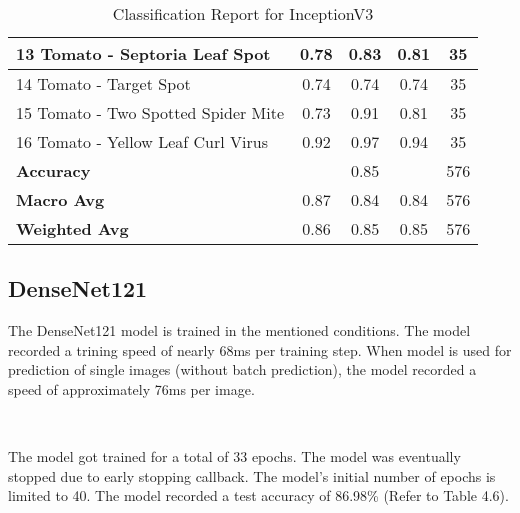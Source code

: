 \begin{table}[h!]
{\begin{tabular}{|l|c|c|c|c|}
    13 Tomato - Septoria Leaf Spot                    & 0.78               & 0.83            & 0.81              & 35               \\ \hline
    14 Tomato - Target Spot                           & 0.74               & 0.74            & 0.74              & 35               \\ \hline
    15 Tomato - Two Spotted Spider Mite               & 0.73               & 0.91            & 0.81              & 35               \\ \hline
    16 Tomato - Yellow Leaf Curl Virus                & 0.92               & 0.97            & 0.94              & 35               \\ \hline
    \textbf{Accuracy}                                 & \multicolumn{3}{c|}{0.85}            & 576              \\ \hline
    \textbf{Macro Avg}                                & 0.87               & 0.84            & 0.84              & 576              \\ \hline
    \textbf{Weighted Avg}                             & 0.86               & 0.85            & 0.85              & 576              \\ \hline
    \end{tabular}%
    }
    \caption{Classification Report for InceptionV3}
    \label{tab:classification_report_inv3}
\end{table}

\subsection{DenseNet121}

The DenseNet121 model is trained in the mentioned conditions. The model recorded a trining speed of nearly 68ms per training step. When model is used for prediction of single images (without batch prediction), the model recorded a speed of approximately 76ms per image. 

\

The model got trained for a total of 33 epochs. The model was eventually stopped due to early stopping callback. The model's initial number of epochs is limited to 40. The model recorded a test accuracy of 86.98\% (Refer to Table 4.6).

